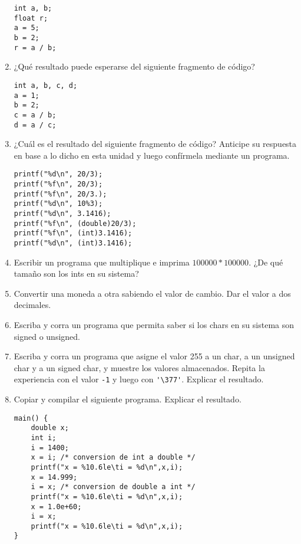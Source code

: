 \begin{enumerate}
	\begin{lstlisting}
int a, b;
float r;
a = 5;
b = 2;
r = a / b;		
	\end{lstlisting}
	\item ¿Qué resultado puede esperarse del siguiente fragmento de código?
	\begin{lstlisting}
int a, b, c, d;
a = 1;
b = 2;
c = a / b;
d = a / c;
	\end{lstlisting}
	\item ¿Cuál es el resultado del siguiente fragmento de código? Anticipe su respuesta en base a lo dicho en
esta unidad y luego confírmela mediante un programa.
	\begin{lstlisting}
printf("%d\n", 20/3);
printf("%f\n", 20/3);
printf("%f\n", 20/3.);
printf("%d\n", 10%3);
printf("%d\n", 3.1416);
printf("%f\n", (double)20/3);
printf("%f\n", (int)3.1416);
printf("%d\n", (int)3.1416);
	\end{lstlisting}
\item Escribir un programa que multiplique e imprima $100000 * 100000$. ¿De qué tamaño son los ints
en su sistema?
\item Convertir una moneda a otra sabiendo el valor de cambio. Dar el valor a dos decimales.
\item Escriba y corra un programa que permita saber si los chars en su sistema son signed o unsigned.
\item Escriba y corra un programa que asigne el valor 255 a un char, a un unsigned char y a un signed
char, y muestre los valores almacenados. Repita la experiencia con el valor \lstinline$-1$ y luego con \lstinline$'\377'$.
Explicar el resultado.
\item Copiar y compilar el siguiente programa. Explicar el resultado.
	\begin{lstlisting}
main() {
	double x;
	int i;
	i = 1400;
	x = i; /* conversion de int a double */
	printf("x = %10.6le\ti = %d\n",x,i);
	x = 14.999;
	i = x; /* conversion de double a int */
	printf("x = %10.6le\ti = %d\n",x,i);
	x = 1.0e+60;
	i = x;
	printf("x = %10.6le\ti = %d\n",x,i);
}
	\end{lstlisting}


\end{enumerate}
